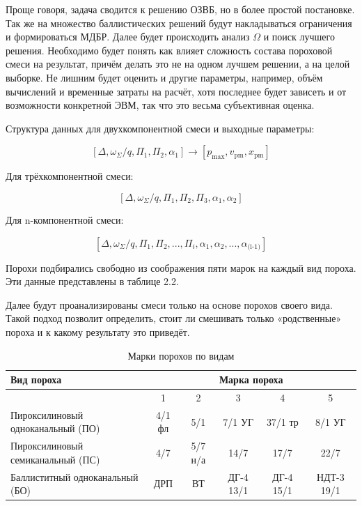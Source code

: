 \documentclass[14pt, a4paper]{extreport} %
\begin{document}
Проще говоря, задача сводится к решению ОЗВБ, но в более простой постановке. Так же на множество баллистических решений будут накладываться ограничения и формироваться МДБР. Далее будет происходить 
анализ $\Omega $ и поиск лучшего решения. Необходимо будет понять как влияет сложность состава пороховой смеси на результат, причём делать это не на одном лучшем решении, а на целой выборке. Не лишним будет 
оценить и другие параметры, например, объём вычислений и временные затраты на расчёт, хотя последнее будет зависеть и от возможности конкретной ЭВМ, так что это весьма субъективная оценка.

Структура данных для двухкомпонентной смеси и выходные параметры: 

\[
 [\varDelta, \omega_\Sigma / q,  \Pi_1, \Pi_2, \alpha_1] \longrightarrow [p_{\text{max}}, v_{\text{pm}}, x_{\text{pm}}]
\]

Для трёхкомпонентной смеси: 

\[
 [\varDelta, \omega_\Sigma / q,  \Pi_1, \Pi_2,\Pi_3,\alpha_1, \alpha_2] 
\]

Для n-компонентной смеси: 

\[
 [\varDelta, \omega_\Sigma / q,  \Pi_1, \Pi_2,...,\Pi_i, \alpha_1, \alpha_2,...,\alpha_{\text{(i-1)}} ] 
\]

Порохи подбирались свободно из соображения пяти марок на каждый вид пороха. Эти данные представлены в таблице 2.2.  

Далее будут проанализированы смеси только на основе порохов своего вида. Такой подход позволит определить, стоит ли смешивать только «родственные» пороха и к какому результату это приведёт. 

\begin{table}[H]
\centering
\caption{Марки порохов по видам}
\begin{tabular}{|>{\raggedright\arraybackslash}p{}|c|c|c|c|c|}
\hline
\textbf{Вид пороха} & \multicolumn{5}{c|}{\textbf{Марка пороха}} \\
\cline{2-6}
 & 1 & 2 & 3 & 4 & 5 \\
\hline
Пироксилиновый одноканальный (ПО) & 4/1 фл & 5/1 & 7/1 УГ & 37/1 тр & 8/1 УГ \\
\hline
Пироксилиновый семиканальный (ПС) & 4/7 & 5/7 н/а & 14/7 & 17/7 & 22/7 \\
\hline
Баллиститный одноканальный (БО) & ДРП & ВТ & ДГ-4 13/1 & ДГ-4 15/1 & НДТ-3 19/1 \\
\hline
\end{tabular}
\end{table}
\end{document}
